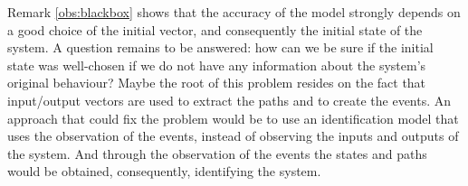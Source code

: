Remark \ref{obs:blackbox} shows that the accuracy of the \DAOCT{} model strongly
depends on a good
choice of the initial vector, and consequently the initial state of the
system. A question remains to be answered: how can we be sure if the
initial state was well-chosen if we do not have any information about the system's original behaviour?
Maybe the root of this problem resides on the fact that input\slash output vectors
are used to extract the paths and to create the events. An approach that could
fix the problem would be to use an identification model that uses 
the observation of the events, instead of observing the inputs and
outputs of the system. And through the observation of the events the states and paths would be obtained, consequently, identifying the system.
